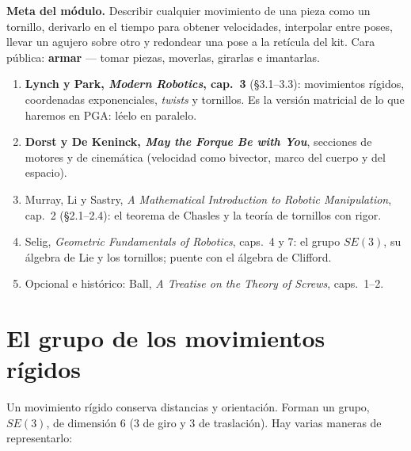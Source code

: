 \documentclass[11pt,a4paper]{article}
\begin{document}
\maketitle
\vspace{-2.5em}

\begin{meta}
\textbf{\textcolor{amarillo}{Meta del módulo.}} Describir cualquier movimiento de una pieza como un tornillo,
derivarlo en el tiempo para obtener velocidades, interpolar entre poses, llevar un agujero sobre otro y redondear una
pose a la retícula del kit. Cara pública: \textbf{armar} — tomar piezas, moverlas, girarlas e imantarlas.
\end{meta}

\begin{lectura}
\begin{enumerate}[leftmargin=*]
  \item \textbf{Lynch y Park, \emph{Modern Robotics}, cap.~3} (§3.1--3.3): movimientos rígidos, coordenadas
        exponenciales, \emph{twists} y tornillos. Es la versión matricial de lo que haremos en PGA: léelo en paralelo.
  \item \textbf{Dorst y De Keninck, \emph{May the Forque Be with You}}, secciones de motores y de cinemática
        (velocidad como bivector, marco del cuerpo y del espacio).
  \item Murray, Li y Sastry, \emph{A Mathematical Introduction to Robotic Manipulation}, cap.~2 (§2.1--2.4): el
        teorema de Chasles y la teoría de tornillos con rigor.
  \item Selig, \emph{Geometric Fundamentals of Robotics}, caps.~4 y 7: el grupo $SE(3)$, su álgebra de Lie y los
        tornillos; puente con el álgebra de Clifford.
  \item Opcional e histórico: Ball, \emph{A Treatise on the Theory of Screws}, caps.~1--2.
\end{enumerate}
\end{lectura}

\section{El grupo de los movimientos rígidos}

Un movimiento rígido conserva distancias y orientación. Forman un grupo, $SE(3)$, de dimensión 6 (3 de giro y 3 de
traslación). Hay varias maneras de representarlo:
\end{document}
